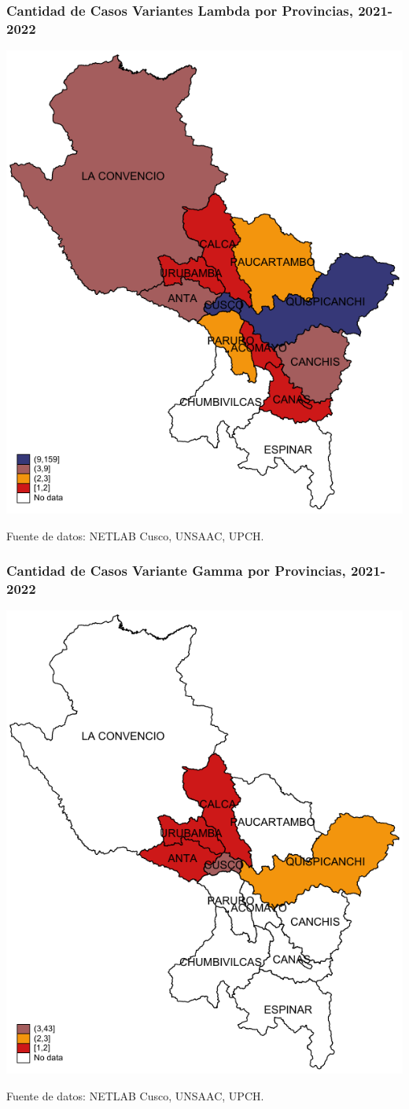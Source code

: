 \documentclass[xcolor=table]{beamer}
\begin{document}
	\begin{frame}[label=mapa_lambda]
		\frametitle{Cantidad de Casos Variantes \textbf{Lambda} por Provincias, 2021-2022}
		\begin{center}
			\includegraphics[width=0.55\linewidth]{../figuras/variantes_provincial_lambda.pdf}
		\end{center}
		{\tiny Fuente de datos: NETLAB Cusco, UNSAAC, UPCH.}
		
		\hyperlink{mapa_variantes}{}
	\end{frame}

	\begin{frame}[label=mapa_gamma]
		\frametitle{Cantidad de Casos  Variante \textbf{Gamma} por Provincias, 2021-2022}
		\begin{center}
			\includegraphics[width=0.55\linewidth]{../figuras/variantes_provincial_gamma.pdf}
		\end{center}
		{\tiny Fuente de datos: NETLAB Cusco, UNSAAC, UPCH.}
		
		\hyperlink{mapa_variantes}{}
	\end{frame}
	
\end{document}
